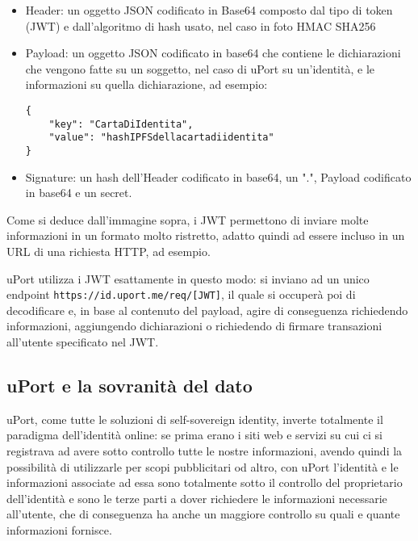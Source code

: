 \begin{itemize}
    \item {\color{headerColor} Header}: un oggetto JSON codificato in Base64
    composto dal tipo di token (JWT) e dall'algoritmo di hash 
    usato, nel caso in foto HMAC SHA256
    \item {\color{payloadColor} Payload}: un oggetto JSON codificato in base64
    che contiene le dichiarazioni
    che vengono fatte su un soggetto, nel caso di uPort su un'identità, e le informazioni
    su quella dichiarazione, ad esempio:

    \begin{lstlisting}
{
    "key": "CartaDiIdentita",
    "value": "hashIPFSdellacartadiidentita"
}
    \end{lstlisting}
    \item {\color{signatureColor} Signature}: un hash dell'Header codificato in base64,
    un ".", Payload codificato in base64 e un secret.
\end{itemize}

Come si deduce dall'immagine sopra, i JWT permettono di inviare 
molte informazioni in un formato molto ristretto, adatto quindi ad essere incluso in un
URL di una richiesta HTTP, ad esempio. 

uPort utilizza i JWT esattamente in questo modo: si inviano ad un unico endpoint
\texttt{https://id.uport.me/req/[JWT]},
il quale si occuperà poi di decodificare e, in base al contenuto del payload,
agire di conseguenza richiedendo informazioni, aggiungendo
dichiarazioni o richiedendo di firmare transazioni all'utente specificato nel JWT. 

\subsection{uPort e la sovranità del dato}

uPort, come tutte le soluzioni di self-sovereign identity, inverte totalmente
il paradigma dell’identità online:
se prima erano i siti web e servizi su cui ci si registrava ad avere sotto controllo
tutte le nostre informazioni, avendo quindi la possibilità di utilizzarle per scopi pubblicitari od altro,
con uPort l’identità e le informazioni associate ad essa sono totalmente sotto il controllo del
proprietario dell’identità e sono le terze parti a dover richiedere le informazioni necessarie all’utente,
che di conseguenza ha anche un maggiore controllo su quali e quante informazioni fornisce.

